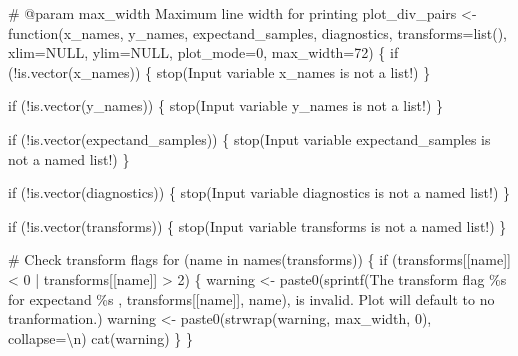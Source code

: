 \documentclass[
  letterpaper,
  DIV=11,
  numbers=noendperiod]{scrartcl}
\newenvironment{Shaded}{\begin{snugshade}}{\end{snugshade}}
\newcommand{\BuiltInTok}[1]{\textcolor[rgb]{0.00,0.23,0.31}{#1}}
\newcommand{\CharTok}[1]{\textcolor[rgb]{0.13,0.47,0.30}{#1}}
\newcommand{\CommentTok}[1]{\textcolor[rgb]{0.37,0.37,0.37}{#1}}
\newcommand{\ControlFlowTok}[1]{\textcolor[rgb]{0.00,0.23,0.31}{#1}}
\newcommand{\DecValTok}[1]{\textcolor[rgb]{0.68,0.00,0.00}{#1}}
\newcommand{\KeywordTok}[1]{\textcolor[rgb]{0.00,0.23,0.31}{#1}}
\newcommand{\NormalTok}[1]{\textcolor[rgb]{0.00,0.23,0.31}{#1}}
\newcommand{\OperatorTok}[1]{\textcolor[rgb]{0.37,0.37,0.37}{#1}}
\newcommand{\SpecialCharTok}[1]{\textcolor[rgb]{0.37,0.37,0.37}{#1}}
\newcommand{\StringTok}[1]{\textcolor[rgb]{0.13,0.47,0.30}{#1}}
\begin{document}
\begin{Shaded}
\begin{Highlighting}[]
\CommentTok{\# @param max\_width Maximum line width for printing}
\NormalTok{plot\_div\_pairs }\OperatorTok{\textless{}{-}}\NormalTok{ function(x\_names, y\_names, }
\NormalTok{                           expectand\_samples, diagnostics, }
\NormalTok{                           transforms}\OperatorTok{=}\BuiltInTok{list}\NormalTok{(), xlim}\OperatorTok{=}\NormalTok{NULL, ylim}\OperatorTok{=}\NormalTok{NULL,}
\NormalTok{                           plot\_mode}\OperatorTok{=}\DecValTok{0}\NormalTok{, max\_width}\OperatorTok{=}\DecValTok{72}\NormalTok{) \{}
  \ControlFlowTok{if}\NormalTok{ (}\OperatorTok{!}\KeywordTok{is}\NormalTok{.vector(x\_names)) \{}
\NormalTok{    stop(}\StringTok{\textquotesingle{}Input variable \textasciigrave{}x\_names\textasciigrave{} is not a list!\textquotesingle{}}\NormalTok{)}
\NormalTok{  \}}
  
  \ControlFlowTok{if}\NormalTok{ (}\OperatorTok{!}\KeywordTok{is}\NormalTok{.vector(y\_names)) \{}
\NormalTok{    stop(}\StringTok{\textquotesingle{}Input variable \textasciigrave{}y\_names\textasciigrave{} is not a list!\textquotesingle{}}\NormalTok{)}
\NormalTok{  \}}
  
  \ControlFlowTok{if}\NormalTok{ (}\OperatorTok{!}\KeywordTok{is}\NormalTok{.vector(expectand\_samples)) \{}
\NormalTok{    stop(}\StringTok{\textquotesingle{}Input variable \textasciigrave{}expectand\_samples\textasciigrave{} is not a named list!\textquotesingle{}}\NormalTok{)}
\NormalTok{  \}}
  
  \ControlFlowTok{if}\NormalTok{ (}\OperatorTok{!}\KeywordTok{is}\NormalTok{.vector(diagnostics)) \{}
\NormalTok{    stop(}\StringTok{\textquotesingle{}Input variable \textasciigrave{}diagnostics\textasciigrave{} is not a named list!\textquotesingle{}}\NormalTok{)}
\NormalTok{  \}}
  
  \ControlFlowTok{if}\NormalTok{ (}\OperatorTok{!}\KeywordTok{is}\NormalTok{.vector(transforms)) \{}
\NormalTok{    stop(}\StringTok{\textquotesingle{}Input variable \textasciigrave{}transforms\textasciigrave{} is not a named list!\textquotesingle{}}\NormalTok{)}
\NormalTok{  \}}
  
  \CommentTok{\# Check transform flags}
  \ControlFlowTok{for}\NormalTok{ (name }\KeywordTok{in}\NormalTok{ names(transforms)) \{}
    \ControlFlowTok{if}\NormalTok{ (transforms[[name]] }\OperatorTok{\textless{}} \DecValTok{0} \OperatorTok{|}\NormalTok{ transforms[[name]] }\OperatorTok{\textgreater{}} \DecValTok{2}\NormalTok{) \{}
\NormalTok{      warning }\OperatorTok{\textless{}{-}} 
\NormalTok{        paste0(sprintf(}\StringTok{\textquotesingle{}The transform flag }\SpecialCharTok{\%s}\StringTok{ for expectand }\SpecialCharTok{\%s}\StringTok{ \textquotesingle{}}\NormalTok{, }
\NormalTok{                       transforms[[name]], name),}
               \StringTok{\textquotesingle{}is invalid.  Plot will default to no tranformation.\textquotesingle{}}\NormalTok{)}
\NormalTok{      warning }\OperatorTok{\textless{}{-}}\NormalTok{ paste0(strwrap(warning, max\_width, }\DecValTok{0}\NormalTok{), collapse}\OperatorTok{=}\StringTok{\textquotesingle{}}\CharTok{\textbackslash{}n}\StringTok{\textquotesingle{}}\NormalTok{)}
\NormalTok{      cat(warning)}
\NormalTok{    \}}
\NormalTok{  \}}
  

\end{Highlighting}
\end{Shaded}
\end{document}
